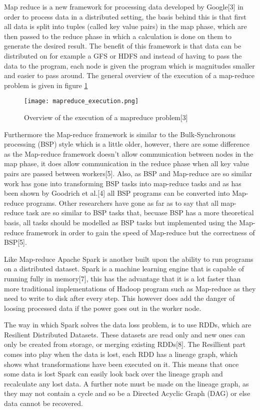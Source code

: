 Map reduce is a new framework for processing data developed by Google[3] in order
to process data in a distributed setting, the basis behind this is that first all
data is split into tuples (called key value pairs) in the map phase, which are then passed to the reduce
phase in which a calculation is done on them to generate the desired result. The
benefit of this framework is that data can be distributed on for example a GFS or HDFS
and instead of having to pass the data to the program, each node is given the program
which is magnitudes smaller and easier to pass around. The general overview of
the execution of a map-reduce problem is given in figure \ref{mapreduce_execution}

\begin{figure}
  \texttt{[image: mapreduce\_execution.png]}
  \caption{Overview of the execution of a mapreduce problem[3]}
  \label{mapreduce_execution}
\end{figure}

Furthermore the Map-reduce framework is similar to the Bulk-Synchronous processing (BSP)
style which is a little older, however, there are some difference as the Map-reduce
framework doesn't allow communication between nodes in the map phase, it does allow
communication in the reduce phase when all key value pairs are passed between workers[5].
Also, as BSP and Map-reduce are so similar work has gone into transforming BSP tasks into
map-reduce tasks and as has been shown by Goodrich et al.[4] all BSP programs can be
converted into Map-reduce programs. Other researchers have gone as far as to say
that all map-reduce task are so similar to BSP tasks that, becuase BSP has a more theoretical
basis, all tasks should be modelled as BSP tasks but implemented using the Map-reduce framework
in order to gain the speed of Map-reduce but the correctness of BSP[5].

Like Map-reduce Apache Spark is another built upon the ability to run programs
on a distributed dataset. Spark is a machine learning engine that is capable of
running fully in memory[7], this has the advantage that it is a lot faster than
more traditional implementations of Hadoop program such as Map-reduce as they need
to write to disk after every step. This however does add the danger of loosing processed data
 if the power goes out in the worker node.

The way in which Spark solves the data loss problem, is to use RDDs, which are
Resilient Distributed Datasets. These datasets are read only and new ones can
only be created from storage, or merging existing RDDs[8]. The Resillient part comes
into play when the data is lost, each RDD has a lineage graph, which shows what
transformations have been executed on it. This means that once some data is lost
Spark can easily look back over the lineage graph and recalculate any lost data.
A further note must be made on the lineage graph, as they may not contain a cycle
and so be a Directed Acyclic Graph (DAG) or else data cannot be recovered.


